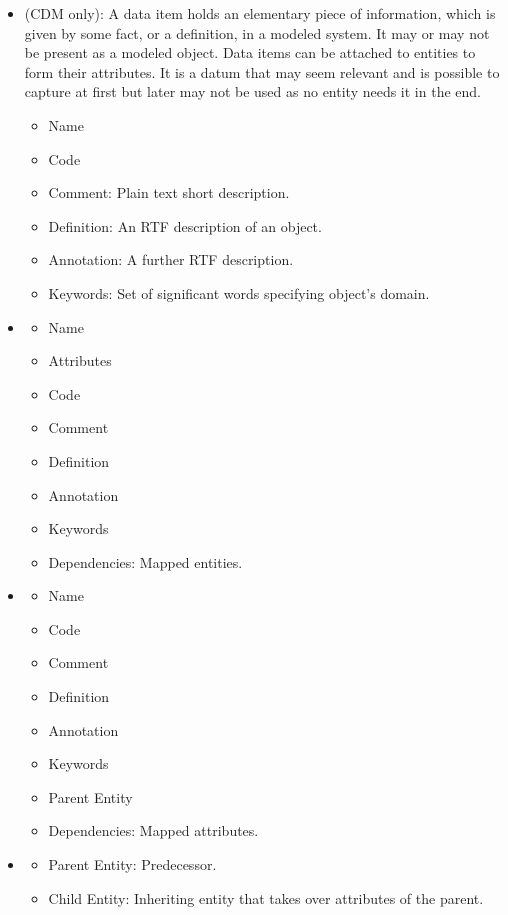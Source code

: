 \begin{itemize}
	\item {}(CDM only): A data item holds an elementary piece of information, which is given by some fact, or a definition, in a modeled system. It may or may not be present as a modeled object. Data items can be attached to entities to form their attributes. It is a datum that may seem relevant and is possible to capture at first but later may not be used as no entity needs it in the end.
	\begin{itemize}
		\item Name
		\item Code
		\item Comment: Plain text short description.
		\item Definition: An RTF description of an object.
		\item Annotation: A further RTF description.
		\item Keywords: Set of significant words specifying object's domain.
	\end{itemize}
	\item {}
	\begin{itemize}
		\item Name 
		\item Attributes
		\item Code 
		\item Comment
		\item Definition
		\item Annotation
		\item Keywords
		\item Dependencies: Mapped entities.
	\end{itemize}
	\item {}
	\begin{itemize}
		\item Name 
		\item Code 
		\item Comment
		\item Definition
		\item Annotation
		\item Keywords
		\item Parent Entity
		\item Dependencies: Mapped attributes.
	\end{itemize}
	\item {}
	\begin{itemize}
		\item Parent Entity: Predecessor.
		\item Child Entity: Inheriting entity that takes over attributes of the parent.
	\end{itemize}
\end{itemize}


